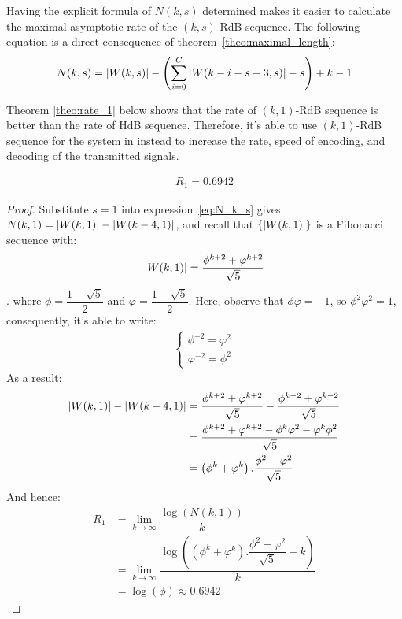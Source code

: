 Having the explicit formula of $N(k,s)$ determined makes it easier to calculate the maximal asymptotic rate of the $(k,s)$-RdB sequence. The following equation is a direct consequence of theorem~\ref{theo:maximal_length}:
\begin{align}
    N(k,s) = \left \lvert  W(k,s) \right \rvert - \left(\sum_{i=0}^{C}\left \lvert  W(k-i-s-3,s) \right \rvert - s\right) + k - 1\label{eq:N_k_s}
\end{align}


Theorem \ref{theo:rate_1} below shows that the rate of $(k,1)$-RdB sequence is better than the rate of \gls{HdB} sequence. Therefore, it's able to use $(k,1)$-RdB sequence for the system in \cite{zhang2021timing} instead to increase the rate, speed of encoding, and decoding of the transmitted signals.

\begin{theorem}\label{theo:rate_1}
    \begin{align}
        R_{1} = 0.6942
    \end{align}
\end{theorem}
\begin{proof}
    Substitute $s=1$ into expression~\ref{eq:N_k_s} gives $N(k,1) = \left \lvert W(k,1) \right \rvert - \left \lvert W(k-4,1) \right \rvert$, and recall that $\{\left \lvert W(k,1) \right \rvert\}$ is a Fibonacci sequence with: 
    \[\left \lvert W(k,1) \right \rvert = \dfrac{\phi^{k+2}+\varphi^{k+2}}{\sqrt{5}}\].
    where $\phi = \dfrac{1+\sqrt{5}}{2}$ and $\varphi = \dfrac{1-\sqrt{5}}{2}$. Here, observe that $\phi\varphi=-1$, so $\phi^{2}\varphi^{2}=1$, consequently, it's able to write:
    \begin{align*}
        \left\{\begin{matrix}
            \phi^{-2} = \varphi^{2} \\
            \varphi^{-2} = \phi^{2}
        \end{matrix}\right.
    \end{align*}
    As a result: 
    \begin{align*}
        \left \lvert W(k,1) \right \rvert - \left \lvert W(k-4,1) \right \rvert &= \dfrac{\phi^{k+2}+\varphi^{k+2}}{\sqrt{5}} - \dfrac{\phi^{k-2}+\varphi^{k-2}}{\sqrt{5}}\\
        &= \dfrac{\phi^{k+2}+\varphi^{k+2}-\phi^{k}\varphi^{2}-\varphi^{k}\phi^{2}}{\sqrt{5}}\\
        &= \left(\phi^{k}+\varphi^{k}\right).\dfrac{\phi^{2}-\varphi^{2}}{\sqrt{5}}
    \end{align*}
    And hence:
    \begin{align*}
        R_{1} &= \lim_{k\to\infty}\dfrac{\log(N(k,1))}{k} \\
        &= \lim_{k\to\infty}\dfrac{ \log\left( \left(\phi^{k}+\varphi^{k}\right).\dfrac{\phi^{2}-\varphi^{2}}{\sqrt{5}}+k \right) }{k} \\
        &= \log(\phi) \approx 0.6942
    \end{align*}
\end{proof}

